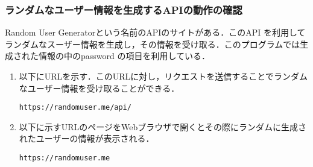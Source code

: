 \documentclass[12pt]{jsarticle}
\begin{document}
\subsubsection{ランダムなユーザー情報を生成するAPIの動作の確認}\label{sec:api}
Random User Generatorという名前のAPIのサイトがある．このAPI を利用してランダムなスーザー情報を生成し，その情報を受け取る．このプログラムでは生成された情報の中のpassword の項目を利用している．

\begin{enumerate}
\item 以下にURLを示す．このURLに対し，リクエストを送信することでランダムなユーザー情報を受け取ることができる．
\begin{verbatim}
https://randomuser.me/api/
\end{verbatim}
\item 以下に示すURLのページをWebブラウザで開くとその際にランダムに生成されたユーザーの情報が表示される．
\begin{verbatim}
https://randomuser.me
\end{verbatim}
\end{enumerate}
\end{document}
